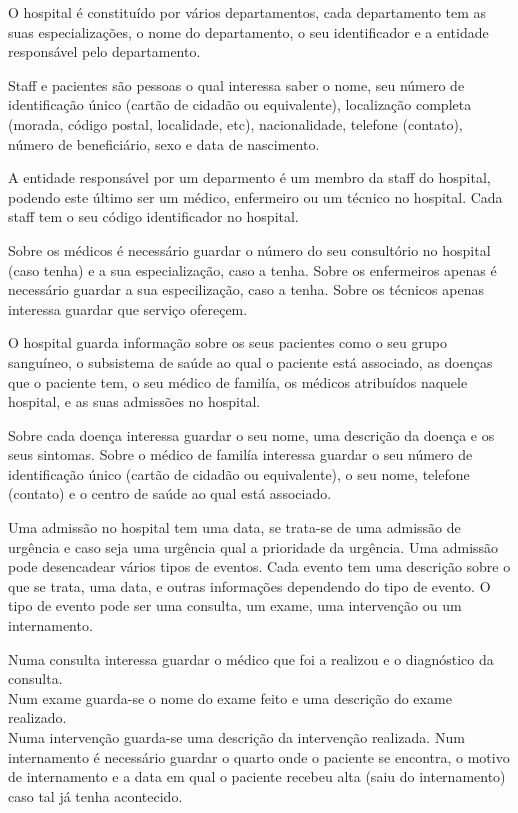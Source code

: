 \documentclass{memoir}
\begin{document}
O hospital é constituído por vários departamentos, cada departamento tem as suas especializações, o nome do departamento, o seu identificador e a entidade responsável pelo departamento.

Staff e pacientes são pessoas o qual interessa saber o nome, seu número de identificação único (cartão de cidadão ou equivalente), localização completa (morada, código postal, localidade, etc), nacionalidade, telefone (contato), número de beneficiário, sexo e data de nascimento.

A entidade responsável por um deparmento é um membro da staff do hospital, podendo este último ser um médico, enfermeiro ou um técnico no hospital. Cada staff tem o seu código identificador no hospital.

Sobre os médicos é necessário guardar o número do seu consultório no hospital (caso tenha) e a sua especialização, caso a tenha.
Sobre os enfermeiros apenas é necessário guardar a sua especilização, caso a tenha.
Sobre os técnicos apenas interessa guardar que serviço ofereçem.

O hospital guarda informação sobre os seus pacientes como o seu grupo sanguíneo, o subsistema de saúde ao qual o paciente está associado, as doenças que o paciente tem, o seu médico de familía, os médicos atribuídos naquele hospital,  e as suas admissões no hospital.

Sobre cada doença interessa guardar o seu nome, uma descrição da doença e os seus sintomas.
Sobre o médico de familía interessa guardar o seu número de identificação único (cartão de cidadão ou equivalente), o seu nome, telefone (contato) e o centro de saúde ao qual está associado.

Uma admissão no hospital tem uma data, se trata-se de uma admissão de urgência e caso seja uma urgência qual a prioridade da urgência. Uma admissão pode desencadear vários tipos de eventos. Cada evento tem uma descrição sobre o que se trata, uma data, e outras informações dependendo do tipo de evento. O tipo de evento pode ser uma consulta, um exame, uma intervenção ou um internamento.

Numa consulta interessa guardar o médico que foi a realizou e o diagnóstico da consulta.\\
Num exame guarda-se o nome do exame feito e uma descrição do exame realizado.\\
Numa intervenção guarda-se uma descrição da intervenção realizada.
Num internamento é necessário guardar o quarto onde o paciente se encontra, o motivo de internamento e a data em qual o paciente recebeu alta (saiu do internamento) caso tal já tenha acontecido.
\end{document}
